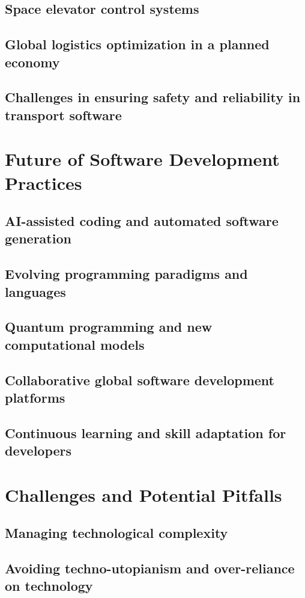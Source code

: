 \subsection{Space elevator control systems}
\subsection{Global logistics optimization in a planned economy}
\subsection{Challenges in ensuring safety and reliability in transport software}

\newpage

\section{Future of Software Development Practices}
\subsection{AI-assisted coding and automated software generation}
\subsection{Evolving programming paradigms and languages}
\subsection{Quantum programming and new computational models}
\subsection{Collaborative global software development platforms}
\subsection{Continuous learning and skill adaptation for developers}

\newpage

\section{Challenges and Potential Pitfalls}
\subsection{Managing technological complexity}
\subsection{Avoiding techno-utopianism and over-reliance on technology}
